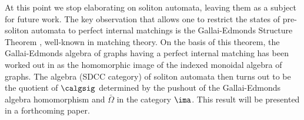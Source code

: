 \documentclass{eptcs}
\begin{document}
At this point we stop elaborating on soliton automata, leaving them as a subject for future
work. The key observation that allows one to restrict the states of pre-soliton automata to
perfect internal matchings is the Gallai-Edmonds Structure Theorem \cite{lov}, well-known in
matching theory. On the basis of this theorem, the Gallai-Edmonds algebra of graphs having
a perfect internal matching has been worked out in \cite{mun} as the homomorphic image of
the indexed monoidal algebra of graphs. The algebra (SDCC category) of soliton automata then turns out 
to be the quotient of $\calgsig $ determined by the pushout of the Gallai-Edmonds algebra homomorphism 
and $\bar \Omega $ in the category $\ima $. This result will be presented in a 
forthcoming paper. 
 \begin{thebibliography}{11}


\end{thebibliography}
\end{document}
